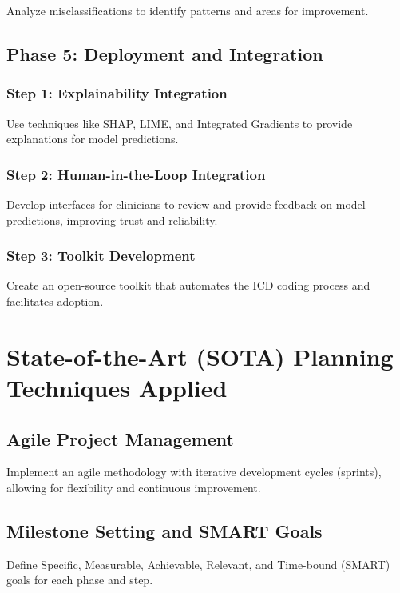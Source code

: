 \documentclass[12pt, a4paper]{article}
\begin{document}
Analyze misclassifications to identify patterns and areas for improvement.

\subsection{Phase 5: Deployment and Integration}

\subsubsection{Step 1: Explainability Integration}

Use techniques like SHAP, LIME, and Integrated Gradients to provide explanations for model predictions.

\subsubsection{Step 2: Human-in-the-Loop Integration}

Develop interfaces for clinicians to review and provide feedback on model predictions, improving trust and reliability.

\subsubsection{Step 3: Toolkit Development}

Create an open-source toolkit that automates the ICD coding process and facilitates adoption.

\section{State-of-the-Art (SOTA) Planning Techniques Applied}

\subsection{Agile Project Management}

Implement an agile methodology with iterative development cycles (sprints), allowing for flexibility and continuous improvement.

\subsection{Milestone Setting and SMART Goals}

Define Specific, Measurable, Achievable, Relevant, and Time-bound (SMART) goals for each phase and step.
\end{document}
